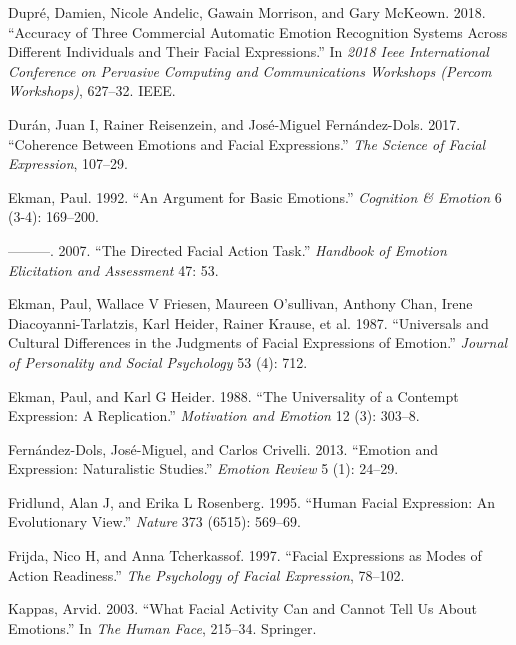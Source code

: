 \documentclass[conference,final,]{IEEEtran}
\begin{document}
\leavevmode\hypertarget{ref-dupre2018accuracy}{}%
Dupré, Damien, Nicole Andelic, Gawain Morrison, and Gary McKeown. 2018.
``Accuracy of Three Commercial Automatic Emotion Recognition Systems
Across Different Individuals and Their Facial Expressions.'' In
\emph{2018 Ieee International Conference on Pervasive Computing and
Communications Workshops (Percom Workshops)}, 627--32. IEEE.

\leavevmode\hypertarget{ref-duran2017coherence}{}%
Durán, Juan I, Rainer Reisenzein, and José-Miguel Fernández-Dols. 2017.
``Coherence Between Emotions and Facial Expressions.'' \emph{The Science
of Facial Expression}, 107--29.

\leavevmode\hypertarget{ref-ekman1992argument}{}%
Ekman, Paul. 1992. ``An Argument for Basic Emotions.'' \emph{Cognition
\& Emotion} 6 (3-4): 169--200.

\leavevmode\hypertarget{ref-ekman2007directed}{}%
---------. 2007. ``The Directed Facial Action Task.'' \emph{Handbook of
Emotion Elicitation and Assessment} 47: 53.

\leavevmode\hypertarget{ref-ekman1987universals}{}%
Ekman, Paul, Wallace V Friesen, Maureen O'sullivan, Anthony Chan, Irene
Diacoyanni-Tarlatzis, Karl Heider, Rainer Krause, et al. 1987.
``Universals and Cultural Differences in the Judgments of Facial
Expressions of Emotion.'' \emph{Journal of Personality and Social
Psychology} 53 (4): 712.

\leavevmode\hypertarget{ref-ekman1988universality}{}%
Ekman, Paul, and Karl G Heider. 1988. ``The Universality of a Contempt
Expression: A Replication.'' \emph{Motivation and Emotion} 12 (3):
303--8.

\leavevmode\hypertarget{ref-fernandez2013emotion}{}%
Fernández-Dols, José-Miguel, and Carlos Crivelli. 2013. ``Emotion and
Expression: Naturalistic Studies.'' \emph{Emotion Review} 5 (1): 24--29.

\leavevmode\hypertarget{ref-fridlund1995human}{}%
Fridlund, Alan J, and Erika L Rosenberg. 1995. ``Human Facial
Expression: An Evolutionary View.'' \emph{Nature} 373 (6515): 569--69.

\leavevmode\hypertarget{ref-frijda1997facial}{}%
Frijda, Nico H, and Anna Tcherkassof. 1997. ``Facial Expressions as
Modes of Action Readiness.'' \emph{The Psychology of Facial Expression},
78--102.

\leavevmode\hypertarget{ref-kappas2003facial}{}%
Kappas, Arvid. 2003. ``What Facial Activity Can and Cannot Tell Us About
Emotions.'' In \emph{The Human Face}, 215--34. Springer.
\end{document}

